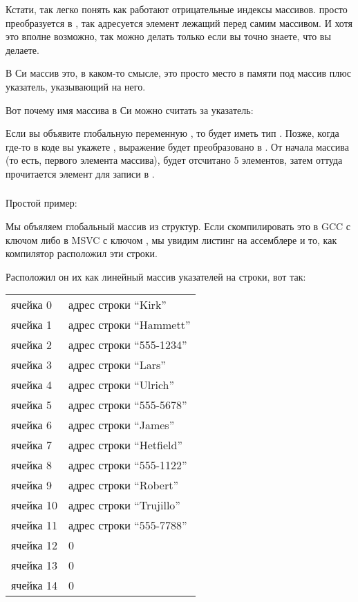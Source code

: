 Кстати, так легко понять как работают отрицательные индексы массивов.  просто преобразуется в ,
так адресуется элемент лежащий перед самим массивом.
И хотя это вполне возможно, так можно делать только если вы точно знаете, что вы делаете.

В Си массив это, в каком-то смысле, это просто место в памяти под массив плюс указатель, указывающий
на него. 

Вот почему имя массива в Си можно считать за указатель:

Если вы объявите глобальную переменную , то  будет иметь тип .
Позже, когда где-то в коде
вы укажете , выражение будет преобразовано в . От начала массива (то есть, первого элемента
массива), будет отсчитано 5 элементов, затем оттуда прочитается элемент для записи в .

\label{PtrArith}
\subsubsection{}

Простой пример:



Мы объяляем глобальный массив из структур. Если скомпилировать это в GCC с ключом  либо в MSVC с ключом
, мы увидим листинг на ассемблере и то, как компилятор расположил эти строки. 

Расположил он их как линейный массив указателей на строки, вот так:

\begin{center}
\begin{tabular}{ | l | l | }
\hline
  ячейка 0    & адрес строки ``Kirk'' \\
  ячейка 1    & адрес строки ``Hammett'' \\
  ячейка 2    & адрес строки ``555-1234'' \\
  ячейка 3    & адрес строки ``Lars'' \\
  ячейка 4    & адрес строки ``Ulrich'' \\
  ячейка 5    & адрес строки ``555-5678'' \\
  ячейка 6    & адрес строки ``James'' \\
  ячейка 7    & адрес строки ``Hetfield'' \\
  ячейка 8    & адрес строки ``555-1122'' \\
  ячейка 9    & адрес строки ``Robert'' \\
  ячейка 10   & адрес строки ``Trujillo'' \\
  ячейка 11   & адрес строки ``555-7788'' \\
  ячейка 12   & 0 \\
  ячейка 13   & 0 \\
  ячейка 14   & 0 \\
\hline
\end{tabular}
\end{center}

